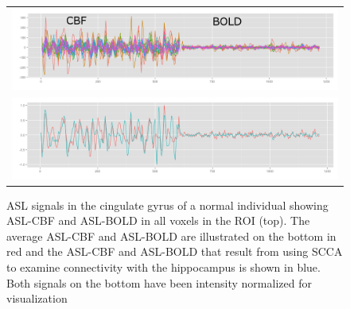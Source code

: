 \documentclass{llncs}
\begin{document}
\begin{figure}[tb]
\begin{center}
\begin{tabular}{ c }
\includegraphics[width=0.75\linewidth]{all_signals3.png}\\
\includegraphics[width=0.75\linewidth]{metric_signals.png} \\
\end{tabular}
\caption{ ASL signals in the cingulate gyrus of a normal individual showing ASL-CBF and ASL-BOLD in all voxels in the ROI (top). The average ASL-CBF and ASL-BOLD are illustrated on the bottom in red and the ASL-CBF and ASL-BOLD that result from using SCCA to examine connectivity with the hippocampus is shown in blue. Both signals on the bottom have been intensity normalized for visualization}
\label{fig:signals}
\end{center}
\end{figure}
\end{document}
